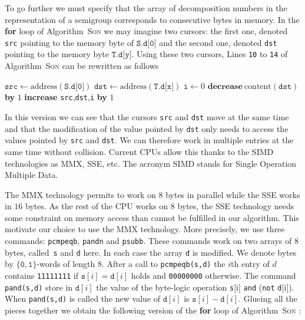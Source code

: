 \documentclass[reqno,11pt]{amsart}
\theoremstyle{plain}
\theoremstyle{definition}
\renewcommand{\leq}{\leqslant}
\renewcommand{\tt}[1]{\texttt{#1}}
\begin{document}
To go further we must specify that the array of decomposition numbers in the representation of a semigroup corresponds to consecutive bytes in memory. 
In the \textbf{for} loop of Algorithm~\textsc{Son} we may imagine two cursors: the first one, denoted \texttt{src}  pointing to the memory byte of $\texttt{S.d[0]}$  and the second one, denoted \texttt{dst} pointing to the memory byte $\texttt{T.d[y]}$.
Using these two cursors, Lines \tt{10} to \tt{14} of Algorithm~\textsc{Son} can be rewritten as follows

\begin{algorithmic}
\State $\tt{src}\gets \text{address}(\tt{S.d[0]})$
\State $\tt{dst}\gets \text{address}(\tt{T.d[x]})$
\State $\tt{i}\gets 0$
\While{$\tt{i}\leq \tt{3G}-\tt{x}$}
\If{$\text{content}(\tt{src})>0$}
\State $\textbf{decrease}\ \text{content}(\tt{dst})$ \textbf{by} $1$\EndIf
\State \textbf{increase} \tt{src},\tt{dst},\tt{i} \textbf{by} $1$

\EndWhile
\end{algorithmic}

\noindent In this version we can see that the cursors \texttt{src} and \texttt{dst} move at the same time and that the modification of  the  value pointed by \texttt{dst}   only  needs to access the values pointed by \tt{src} and \tt{dst}. 
We can therefore work in multiple entries at the same time without collision. 
Current CPUs allow this thanks to the SIMD technologies as MMX, SSE, etc.
The acronym SIMD stands for Single Operation Multiple Data. 

The MMX technology  permits to work on $8$ bytes in parallel while the SSE works in $16$ bytes. 
As the rest of the CPU works on $8$ bytes, the SSE technology needs some constraint on memory access than cannot be fulfilled in our algorithm. 
This motivate our choice to use the MMX technology. 
More precisely, we use three commands: \tt{pcmpeqb}, \tt{pandn} and \tt{psubb}.
 These commands work on two arrays of $8$ bytes, called~\tt{s} and \tt{d} here. 
 In each case the array \tt{d} is modified. 
 We denote bytes by $\{\tt{0},\tt{1}\}$-words of length $8$.
 After a call to \tt{pcmpeqb(s,d)} the $i$th entry of $d$ contains \tt{11111111} if $\tt{s}[i]=\tt{d}[i]$ holds and \tt{00000000} otherwise. 
 The command \tt{pand(s,d)}  store in $\tt{d}[i]$  the value of the byte-logic operation \tt{s}[i] \tt{and} (\tt{not} \tt{d}[i]).
  When \tt{pand(s,d)} is called the new value of $\tt{d}[i]$ is $\tt{s}[i]-\tt{d}[i]$.  
  Glueing all the pieces together we obtain the following version of the \textbf{for} loop of Algorithm~\textsc{Son} :
\end{document}
